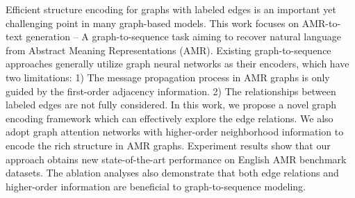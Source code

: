 Efficient structure encoding for graphs with labeled edges is an important yet challenging point in many graph-based models. This work focuses on AMR-to-text generation -- A graph-to-sequence task aiming to recover natural language from Abstract Meaning Representations (AMR). Existing graph-to-sequence approaches generally utilize graph neural networks as their encoders, which have two limitations: 1) The message propagation process in AMR graphs is only guided by the first-order adjacency information. 2) The relationships between labeled edges are not fully considered. In this work, we propose a novel graph encoding framework which can effectively explore the edge relations. We also adopt graph attention networks with higher-order neighborhood information to encode the rich structure in AMR graphs. Experiment results show that our approach obtains new state-of-the-art performance on English AMR benchmark datasets. The ablation analyses also demonstrate that both edge relations and higher-order information are beneficial to graph-to-sequence modeling.
